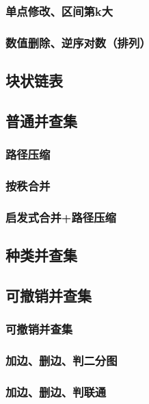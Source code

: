 \documentclass[10pt,a4paper]{article}
\begin{document}
	\subsubsection{单点修改、区间第k大}
	
	\subsubsection{数值删除、逆序对数（排列）}
	
	\subsection{块状链表}
	
	\subsection{普通并查集}
	\subsubsection{路径压缩}
	
	\subsubsection{按秩合并}
	
	\subsubsection{启发式合并+路径压缩}
	
	\subsection{种类并查集}
	\subsection{可撤销并查集}
	\subsubsection{可撤销并查集}
	
	\subsubsection{加边、删边、判二分图}
	
	\subsubsection{加边、删边、判联通}
	
\end{document}
